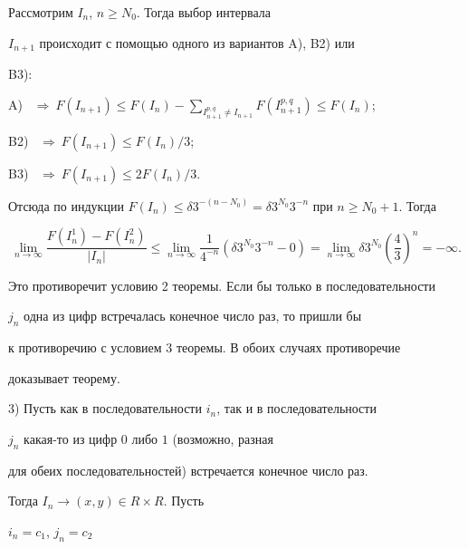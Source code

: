 \begin{pf}
Рассмотрим $I_{n}$, $n\ge N_{0}$. Тогда выбор интервала


$I_{n+1}$ происходит с помощью одного из вариантов A), B2) или


B3):





A) \ $\Rightarrow \ F(I_{n+1})\le F(I_{n})-\sum\limits _{I^{p,q}_{n+1}\neq


I_{n+1}}F(I^{p,q}_{n+1})\le F(I_{n})$;





B2) \ $\Rightarrow \ F(I_{n+1})\le F(I_{n})/3$; 





B3) \ $\Rightarrow \ F(I_{n+1})\le 2F(I_{n})/3$. 





Отсюда по индукции $F(I_{n})\le \delta 3^{-(n-N_{0})}=


\delta 3^{N_{0}}3^{-n}$ при $n\ge N_{0}+1$. Тогда 


$$


\lim\limits_{n \to \infty}


\displaystyle\frac{F(I^{1}_{n})-F(I^{2}_{n})}


{| I_{n}| }\le \lim\limits_{n \to \infty} \displaystyle\frac{1}{4^{-n}}


(\delta 3^{N_{0}}3^{-n}-0)=\lim\limits_{n \to \infty} \delta 3^{N_{0}}


\left(\frac{4}{3}\right)^{n}=-\infty.


$$


Это противоречит условию 2 теоремы. Если бы только в последовательности


$j_{n}$ одна из цифр встречалась конечное число раз, то пришли бы


к противоречию с условием 3 теоремы. В обоих случаях противоречие


доказывает теорему.





3) Пусть как в последовательности $i_{n}$, так и в последовательности


$j_{n}$ какая-то из цифр $0$ либо $1$ (возможно, разная


для обеих последовательностей) встречается конечное число раз. 


Тогда $I_{n}\rightarrow (x,y)\in R\times R$. Пусть 


$i_{n}=c_{1}$, $j_{n}=c_{2}$



\end{pf}

